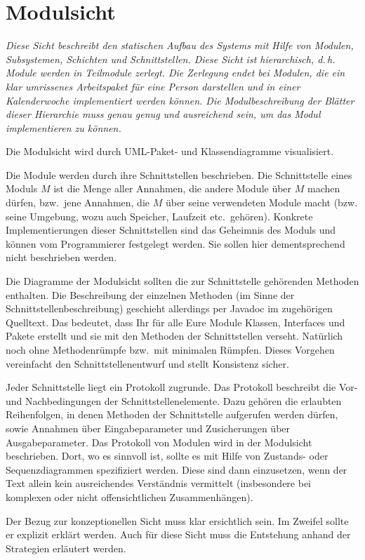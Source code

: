 \documentclass[fontsize=12pt,paper=a4,twoside]{scrartcl}
\begin{document}
\section{Modulsicht} \label{sec:modulsicht}

{\itshape Diese Sicht beschreibt den statischen Aufbau des Systems mit Hilfe von
Modulen, Subsystemen, Schichten und Schnittstellen. Diese Sicht ist 
hierarchisch, d.\,h. Module werden in Teilmodule zerlegt. Die Zerlegung endet 
bei Modulen, die ein klar umrissenes Arbeitspaket für eine Person darstellen und
in einer Kalenderwoche implementiert werden können. Die Modulbeschreibung der 
Blätter dieser Hierarchie muss genau genug und ausreichend sein, um das Modul 
implementieren zu können.

Die Modulsicht wird durch {UML}-Paket- und Klassendiagramme visualisiert.

Die Module werden durch ihre Schnittstellen beschrieben.
Die Schnittstelle eines Moduls $M$ ist die Menge aller Annahmen, die andere 
Module über $M$ machen dürfen, bzw.\ jene Annahmen, die $M$ über seine 
verwendeten Module macht (bzw. seine Umgebung, wozu auch Speicher, Laufzeit 
etc.\ gehören).
Konkrete Implementierungen dieser Schnittstellen sind das Geheimnis des Moduls
und können vom Programmierer festgelegt werden. Sie sollen hier dementsprechend 
nicht beschrieben werden. 

Die Diagramme der Modulsicht sollten die zur Schnittstelle gehörenden Methoden
enthalten. Die Beschreibung der einzelnen Methoden (im Sinne der 
Schnittstellenbeschreibung) geschieht allerdings per Javadoc im zugehörigen 
Quelltext. Das bedeutet, dass Ihr für alle Eure Module Klassen, Interfaces und 
Pakete erstellt und sie mit den Methoden der Schnittstellen verseht. Natürlich 
noch ohne Methodenrümpfe bzw.\ mit minimalen Rümpfen. Dieses Vorgehen 
vereinfacht den Schnittstellenentwurf und stellt Konsistenz sicher.

Jeder Schnittstelle liegt ein Protokoll zugrunde. Das Protokoll beschreibt die 
Vor- und Nachbedingungen der Schnittstellenelemente. Dazu gehören die erlaubten
Reihenfolgen, in denen Methoden der Schnittstelle aufgerufen werden dürfen, 
sowie Annahmen über Eingabeparameter und Zusicherungen über Ausgabeparameter. 
Das Protokoll von Modulen wird in der Modulsicht beschrieben.
Dort, wo es sinnvoll ist, sollte es mit Hilfe von Zustands- oder 
Sequenzdiagrammen spezifiziert werden. Diese sind dann einzusetzen, wenn der
Text allein kein ausreichendes Verständnis vermittelt (insbesondere bei 
komplexen oder nicht offensichtlichen Zusammenhängen).

Der Bezug zur konzeptionellen Sicht muss klar ersichtlich sein. Im Zweifel 
sollte er explizit erklärt werden. Auch für diese Sicht muss die Entstehung 
anhand der Strategien erläutert werden.}
\end{document}
